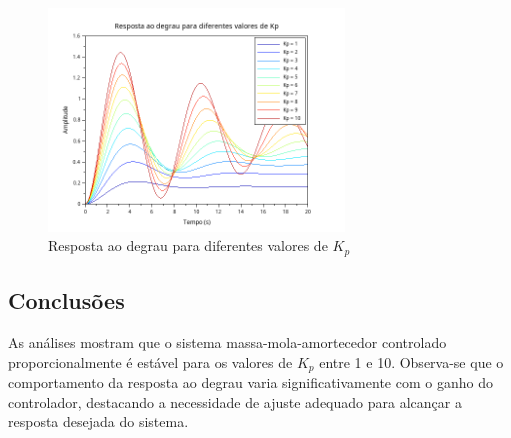 \begin{figure}[H]
    \centering
    \includegraphics[width=0.7\textwidth]{4-atividade/assets/impulsos-diferentes-kp.png}
    \caption{Resposta ao degrau para diferentes valores de \( K_p \)}
    \label{fig:resposta-degrau-kp}
\end{figure}

\subsection{Conclusões}
As análises mostram que o sistema massa-mola-amortecedor controlado proporcionalmente é estável para os valores de \( K_p \) entre 1 e 10. Observa-se que o comportamento da resposta ao degrau varia significativamente com o ganho do controlador, destacando a necessidade de ajuste adequado para alcançar a resposta desejada do sistema.
